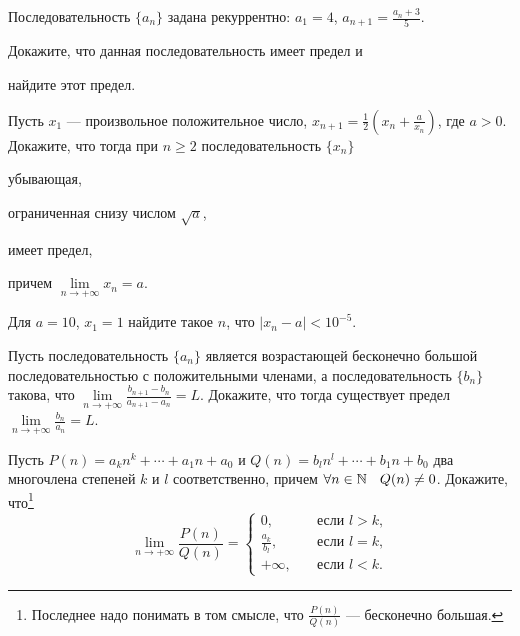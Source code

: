 \documentclass[a4paper, 12pt, num=31]{listok}
\begin{document}
\begin{problem}
    Последовательность $\{a_n\}$ задана рекуррентно: $a_1 = 4$, $a_{n + 1} = \frac{a_n + 3}5$.
    \begin{probparts}
        \item Докажите, что данная последовательность имеет предел и
        \item найдите этот предел.
    \end{probparts}
\end{problem}
\begin{problem}
    Пусть $x_1$ --- произвольное положительное число, $x_{n + 1} = \frac12 \left ( x_n + \frac a{x_n} \right )$, где $a > 0$.
    Докажите, что тогда при $n \ge 2$ последовательность $\{x_n\}$
    \begin{probparts}
        \item убывающая,
        \item ограниченная снизу числом $\sqrt a$,
        \item имеет предел,
        \item причем $\lim\limits_{n \to + \infty} x_n = a$.
        \item Для $a = 10$, $x_1 = 1$ найдите такое $n$, что $|x_n - a| < 10^{-5}$.
    \end{probparts}
\end{problem}
\begin{problem}
    Пусть последовательность $\{a_n\}$ является возрастающей бесконечно большой последовательностью с положительными членами,
    а последовательность $\{b_n\}$ такова, что $\lim\limits_{n\to+\infty}\frac{b_{n + 1} - b_n}{a_{n + 1} - a_n} = L$.
    Докажите, что тогда существует предел $\lim\limits_{n\to+\infty}\frac{b_n}{a_n} = L$.
\end{problem}
\begin{problem}
    Пусть $P(n) = a_k n^k + \cdots + a_1 n + a_0$ и $Q(n) = b_l n^l + \cdots + b_1 n + b_0$  два многочлена степеней $k$ и $l$ соответственно,
    причем $\forall{n \in \N} Q(n) \ne 0$.
    Докажите, что\footnote{Последнее надо понимать в том смысле, что $\frac{P (n)}{Q (n)}$ --- бесконечно большая.}
    \[
        \lim_{n \to + \infty} \frac{P(n)}{Q(n)} = \left \{ 
        \begin{aligned}
            0, & \quad\text{если $l > k$,} \\
            \frac{a_k}{b_l}, & \quad\text{если $l = k$,}\\
            +\infty, & \quad\text{если $l < k$.}
        \end{aligned}
        \right . 
    \]
\end{problem}
\end{document}
